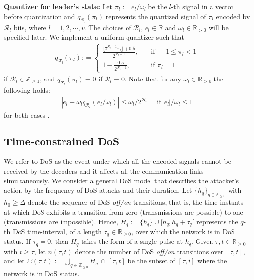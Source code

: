 \documentclass{autart}
\begin{document}
\textbf{Quantizer for leader's state:}
 Let 
$
\pi_l:= e_l/\omega_l
$
be the $l$-th signal in a vector before quantization and
$q_{\mathcal R_l} (\pi_l)$ represents the quantized signal of $\pi_l$ encoded by $\mathcal R_l$ bits, where $l= 1, 2, \cdots, v$. The choices of $\mathcal R_l$, $e_l \in \mathbb{R}$ and $\omega_l\in\mathbb{R}_{ > 0}$ will be specified later. We implement a uniform quantizer such that 
\begin{align} \label{uniform quantizer}
q_{\mathcal R_l} (\pi_l) : = 
\left \{ \begin{array}{ll} 
\frac{\lfloor 2^{\mathcal R_l-1} \pi_l \rfloor + 0.5}{ 2^{\mathcal R_l-1} }, &  \quad  \textrm{if } -1 \le \pi_l < 1  \\ 
1- \frac{0.5}{2^{\mathcal R_l-1}}, & \quad  \textrm{if } \pi_l=1
\end{array} \right. 
\end{align} 
if $\mathcal R_l \in \mathbb{Z}_{\ge 1} $, and 
$
q _{\mathcal R_l} (\pi_l) =0
$
if $\mathcal R_l = 0 $. Note that for any $\omega_l \in \mathbb{R}_{> 0} $ the following holds:
\begin{align} \label{Property of quantizer}
\left| e_l - \omega_l q_{\mathcal R_l} \left(e_l / \omega_l \right)  \right| \le \omega_l / 2^{\mathcal R_l}, \quad \textrm{if}   \,|e_l|/ \omega_l \le 1
\end{align}
for both cases \cite{you2010minimum}. 




\subsection{Time-constrained DoS}

We refer to DoS as the event under which all the encoded signals cannot be received by the decoders and it affects all the communication links simultaneously.  
We consider a general DoS model
that describes the attacker's action by the frequency of DoS attacks and their duration. Let 
$\{h_q\}_{q \in \mathbb Z_{\ge 0}}$ with $h_0 \geq \Delta$ denote the sequence 
of DoS \emph{off/on} transitions, that is,
the time instants at which DoS exhibits 
a transition from zero (transmissions are possible) to one 
(transmissions are impossible).
Hence,
$
H_q :=\{h_q\} \cup [h_q,h_q+\tau_q[  
$
represents the $q$-th DoS time-interval, of a length $\tau_q \in \mathbb R_{\geq 0}$,
over which the network is in DoS status. If $\tau_q=0$, then
$H_q$ takes the form of a single pulse at $h_q$.  
Given $\tau,t \in \mathbb R_{\geq0}$ with $t\geq\tau$, 
let $n(\tau,t)$
denote the number of DoS \emph{off/on} transitions
over $[\tau,t]$, and let 
$
\Xi(\tau,t) := \bigcup_{q \in \mathbb Z_{\ge 0}} H_q  \, \cap  \, [\tau,t] 
$
be the subset of $[\tau,t]$ where the network is in DoS status. 
\end{document}

